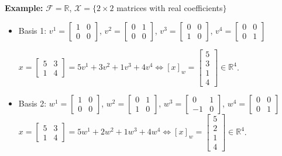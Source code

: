 \documentclass[letterpaper]{article}
\begin{document}
\noindent \textbf{Example:} $\mathcal{F}=\mathbb{R}$, $\mathcal{X}=\{2\times2$ matrices with real coefficients$\}$
    \begin{itemize}
        \item[] Basis 1: $v^{1}=\left[\begin{array}{cc}
            1 & 0\\
            0 & 0
            \end{array}\right]$, $v^{2}=\left[\begin{array}{cc}
            0 & 1\\
            0 & 0
            \end{array}\right]$, $v^{3}=\left[\begin{array}{cc}
            0 & 0\\
            1 & 0
            \end{array}\right]$, $v^{4}=\left[\begin{array}{cc}
            0 & 0\\
            0 & 1
            \end{array}\right]$
            
                $x=\left[\begin{array}{cc}
        5 & 3\\
        1 & 4
        \end{array}\right]=5v^{1}+3v^{2}+1v^{3}+4v^{4} \iff \left[x\right]_w=\left[\begin{array}{c}
        5\\
        3\\
        1\\
        4
    \end{array}\right]\in \mathbb{R}^4$.
        \item[] Basis 2: $w^{1}=\left[\begin{array}{cc}
            1 & 0\\
            0 & 0
            \end{array}\right]$, $w^{2}=\left[\begin{array}{cc}
            0 & 1\\
            1 & 0
            \end{array}\right]$, $w^{3}=\left[\begin{array}{cc}
            0 & 1\\
            -1 & 0
            \end{array}\right]$, $w^{4}=\left[\begin{array}{cc}
            0 & 0\\
            0 & 1
            \end{array}\right]$
                $x=\left[\begin{array}{cc}
        5 & 3\\
        1 & 4
        \end{array}\right]=5w^{1}+2w^{2}+1w^{3}+4w^{4} \iff \left[x\right]_w=\left[\begin{array}{c}
        5\\
        2\\
        1\\
        4
    \end{array}\right]\in \mathbb{R}^4$.
    \end{itemize}
\end{document}
